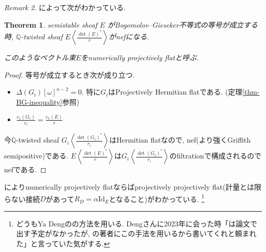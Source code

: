 \documentclass[dvipdfmx,a4paper,11pt]{article} %
\newtheorem{thm}{Theorem}[section]
\theoremstyle{definition}
\theoremstyle{remark}
\newtheorem{rem}[thm]{Remark}
\numberwithin{equation}{section}
\newcommand{\Q}{\mathbb{Q}}
\begin{document}
\begin{rem}
\cite{LOY24}によって次がわかっている. 
\begin{thm}
semistable sheaf $E$ がBogomolov--Gieseker不等式の等号が成立する時, 
$\Q$-twisted sheaf $E\left\langle\frac{\det(E)^{*}}{r}\right\rangle$がnefになる. 

このようなベクトル束$E$をnumerically projectively flatと呼ぶ.
\end{thm}
\begin{proof}
等号が成立するとき次が成り立つ. 
\begin{itemize}
\item $\Delta(G_{i})[\omega]^{n-2}=0$. 特に$G_i$はProjectively Hermitian flatである. (定理\ref{thm-BG-inequality}参照)
\item $\frac{c_1(G_i)}{r_i}=\frac{c_1(E)}{r}$
\end{itemize}
今$\Q$-twisted sheaf $G_i \left\langle\frac{\det(G_i)^{*}}{r_i}\right\rangle$はHermitian flatなので, nef(より強くGriffith semipositive)である. 
$E\left\langle\frac{\det(E)^{*}}{r}\right\rangle$は$G_i \left\langle\frac{\det(G_i)^{*}}{r_i}\right\rangle$のfiltrationで構成されるのでnefである. 
\end{proof}
 \cite{LOY24}によりnumerically projectively 
 flatならばprojectively projectively flat(計量とは限らない接続$D$があって$R_D=\alpha \mathrm{Id}_{E}$となること)がわかっている. \footnote{どうもYa Dengの\cite{Deng21b}の方法を用いる. Dengさんに2023年に会った時「\cite{Deng21b}は論文で出す予定がなかったが,  \cite{LOY24}の著者にこの手法を用いるから書いてくれと頼まれた」と言っていた気がする.}
\end{rem}
\end{document}
